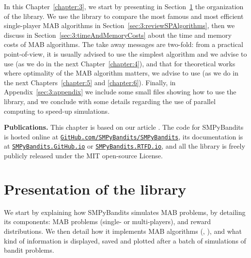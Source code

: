 In this Chapter~\ref{chapter:3}, we start by presenting in Section~\ref{sec:3:presentationLibrary} the organization of the library.
We use the library to compare the most famous and most efficient single-player MAB algorithms in Section~\ref{sec:3:reviewSPAlgorithms},
then we discuss in Section~\ref{sec:3:timeAndMemoryCosts} about the time and memory costs of MAB algorithms.
The take away messages are two-fold:
from a practical point-of-view, it is usually advised to use the simplest algorithm and we advise to use \UCB{} (as we do in the next Chapter~\ref{chapter:4}),
and that for theoretical works where optimality of the MAB algorithm matters, we advise to use \klUCB{} (as we do in the next Chapters~\ref{chapter:5} and \ref{chapter:6}).
%
Finally, in Appendix~\ref{sec:3:appendix} we include some small files showing how to use the library, and we conclude with some details regarding the use of parallel computing to speed-up simulations.


\textbf{Publications.}
%
This chapter is based on our article \cite{SMPyBanditsJMLR}.
The code for SMPyBandits is hosted online at \texttt{\href{https://GitHub.com/SMPyBandits/SMPyBandits/}{GitHub.com/SMPyBandits/SMPyBandits}}, its documentation is at \texttt{\href{https://SMPyBandits.GitHub.io/}{SMPyBandits.GitHub.io}} or \texttt{\href{https://SMPyBandits.RTFD.io/}{SMPyBandits.RTFD.io}}, and all the library is freely publicly released under the MIT open-source License.


\section{Presentation of the library}
\label{sec:3:presentationLibrary}


We start by explaining how SMPyBandits simulates MAB problems, by detailing its components:
MAB problems (single- or multi-players),
and reward distributions.
%
We then detail how it implements MAB algorithms (\eg, \UCB),
and what kind of information is displayed, saved and plotted after a batch of simulations of bandit problems.

